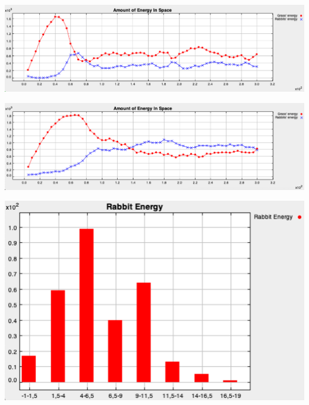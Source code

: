 \documentclass[11pt]{article}
\begin{document}
\begin{minipage}[]{\textwidth}

\begin{minipage}[]{0.5\textwidth}
\begin{minipage}[]{\textwidth}
\includegraphics[width=\textwidth]{1-rabbits/Images-report/evolution-20.png}
\end{minipage}
\hfill
\begin{minipage}[]{\textwidth}
\includegraphics[width=\textwidth]{1-rabbits/Images-report/evolution-50.png}
\label{fig:exp1}
\end{minipage}{}

\end{minipage}{}
\hfill
\begin{minipage}[]{0.35\textwidth}
 \includegraphics[width=\textwidth]{1-rabbits/Images-report/rabbit-energy-150.png}
\label{fig:exp2}
\end{minipage}{}

\end{minipage}{}
\end{document}
